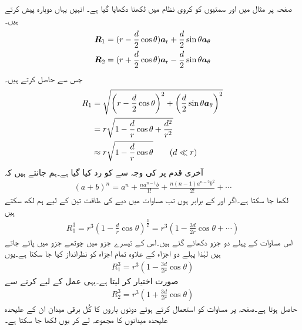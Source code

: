 صفحہ  پر مثال  میں  اور
  سمتیوں کو کروی نظام میں لکھنا دکھایا گیا ہے۔ انہیں یہاں دوبارہ پیش کرتے ہیں۔
\begin{align*}
{\ensuremath{{\boldsymbol{R}}}}_1 &=(r-\frac{d}{2}\cos\theta){\boldsymbol{a}}_{\textup{r}}+\frac{d}{2}\sin\theta {\boldsymbol{a}}_{\theta}\\
{{\boldsymbol{R}}}_2 &=(r+\frac{d}{2}\cos \theta ){\boldsymbol{a}}_{\textup{r}}-\frac{d}{2}\sin \theta {\boldsymbol{a}}_{\theta}
\end{align*}
جس سے  حاصل کرتے ہیں۔
\begin{gather}
\begin{aligned}\label{مساوات_توانائی_جفت_قطب_فاصلے}
R_1&=\sqrt{\left(r-\frac{d}{2}\cos\theta\right)^2+\left(\frac{d}{2}\sin\theta {\boldsymbol{a}}_{\theta} \right)^2}\\
&=r \sqrt{1-\frac{d}{r} \cos \theta +\frac{d^2}{r^2}}\\
&\approx r \sqrt{1-\frac{d}{r} \cos \theta } \quad \quad (d \ll r)
\end{aligned}
\end{gather}
آخری قدم پر  کی وجہ سے   کو رد کیا گیا ہے۔ہم جانتے ہیں کہ
\begin{align*}
(a+b)^n=a^n +\frac{n a^{n-1}b}{1!}+\frac{n(n-1)a^{n-2}b^2}{2!}+\cdots
\end{align*}
لکھا جا سکتا ہے۔اگر  اور  کے برابر ہوں تب مساوات  میں دیے  کی طاقت تین کے لیے ہم لکھ سکتے ہیں
\begin{align*}
R_1^3=r^3 (1-\tfrac{d}{r} \cos \theta)^{\frac{3}{2}}=r^3 \left( 1-\tfrac{3d}{2 r} \cos \theta+\cdots \right)
\end{align*}
اس مساوات کے پہلے دو جزو دکھائے گئے ہیں۔اس کے تیسرے جزو میں چوتھے جزو میں  پائے جاتے ہیں  لہٰذا پہلے دو اجزاء کے علاوہ تمام اجزاء کو نظرانداز کیا جا سکتا ہے۔یوں
\begin{align}
R_1^3=r^3 \left(1-\frac{3d}{2r} \cos \theta\right)
\end{align}
صورت اختیار کر لیتا ہے۔یہی عمل  کے لیے کرنے سے
\begin{align}
R_2^3=r^3 \left(1+\frac{3d}{2r} \cos \theta\right)
\end{align}
حاصل ہوتا ہے۔صفحہ  پر مساوات  کو استعمال کرتے ہوئے دونوں باروں کا کُل برقی میدان ان کے علیحدہ علیحدہ میدانوں کا مجموعہ لے کر یوں لکھا جا سکتا ہے۔
